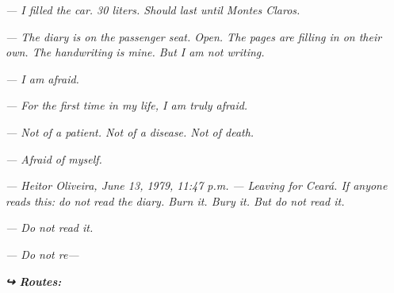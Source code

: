 \noindent \textit{--- I filled the car. 30 liters. Should last until Montes Claros.}

\noindent \textit{--- The diary is on the passenger seat. Open. The pages are filling in on their own. The handwriting is mine. But I am not writing.}

\noindent \textit{--- I am afraid.}

\noindent \textit{--- For the first time in my life, I am truly afraid.}

\noindent \textit{--- Not of a patient. Not of a disease. Not of death.}

\noindent \textit{--- Afraid of myself.}

\noindent \textit{--- Heitor Oliveira, June 13, 1979, 11:47 p.m.}
\textit{--- Leaving for Ceará. If anyone reads this: do not read the diary. Burn it. Bury it. But do not read it.}

\noindent \textit{--- Do not read it.}

\noindent \textit{--- Do not re---}

\vspace{0.5em}
\noindent\textit{\textbf{↪ Routes:}  \rotasep {} \rotasep {}}
